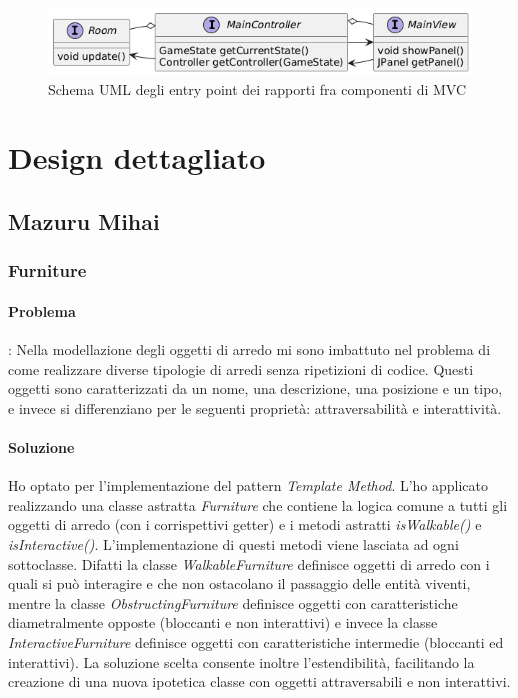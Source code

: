 \documentclass[a4paper,12pt]{report}
\begin{document}
\begin{figure}[H]
	\centering{}
	\includegraphics[width=\textwidth]{img/mvc.png}
	\caption{Schema UML degli entry point dei rapporti fra componenti di MVC}
	\label{img:mvc}
\end{figure}

\section{Design dettagliato}

\subsection{Mazuru Mihai}

\subsubsection{Furniture}
\paragraph{Problema}: Nella modellazione degli oggetti di arredo mi sono imbattuto nel problema 
di come realizzare diverse tipologie di arredi senza ripetizioni di codice. Questi oggetti 
sono caratterizzati da un nome, una descrizione, una posizione e un tipo, e invece si differenziano 
per le seguenti proprietà: attraversabilità e interattività.
\paragraph{Soluzione} Ho optato per l'implementazione del pattern \textit{Template Method}. 
L'ho applicato realizzando una classe astratta \textit{Furniture} che contiene la logica comune a 
tutti gli oggetti di arredo (con i corrispettivi getter) e i metodi astratti \textit{isWalkable()} e 
\textit{isInteractive()}. L'implementazione di questi metodi viene lasciata ad ogni sottoclasse.
Difatti la classe \textit{WalkableFurniture} definisce oggetti di arredo con i quali si può interagire e
che non ostacolano il passaggio delle entità viventi, mentre la classe \textit{ObstructingFurniture} 
definisce oggetti con caratteristiche diametralmente opposte (bloccanti e non interattivi) e 
invece la classe \textit{InteractiveFurniture} definisce oggetti con caratteristiche intermedie (bloccanti ed interattivi).
\newline La soluzione scelta consente inoltre l'estendibilità, facilitando la creazione di una nuova
ipotetica classe con oggetti attraversabili e non interattivi.
\end{document}
